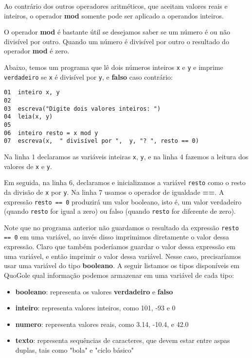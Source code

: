 \documentclass{report}
\newcommand{\Qgol}{QuoGol\;}
\begin{document}
Ao contrário dos outros operadores aritméticos, que aceitam
valores reais e inteiros, o operador \textbf{mod} somente pode
ser aplicado a operandos inteiros. 

O operador \textbf{mod} é bastante útil se desejamos saber se
um número é ou não divisível por outro. Quando um número é divisível
por outro o resultado do operador \textbf{mod} é zero.

Abaixo, temos um programa que lê dois números inteiros \texttt{x} e \texttt{y}
e imprime \texttt{verdadeiro} se \texttt{x} é divisível por \texttt{y}, e
\textbf{falso} caso contrário:
%
\begin{verbatim}
01  inteiro x, y
02  
03  escreva("Digite dois valores inteiros: ")
04  leia(x, y)
05 
06  inteiro resto = x mod y
07  escreva(x,  " divisível por ",  y, "? ", resto == 0)
\end{verbatim}

Na linha 1 declaramos as variáveis inteiras \texttt{x}, \texttt{y},
e na linha 4 fazemos a leitura dos valores de \texttt{x} e \texttt{y}.

Em seguida, na linha 6, declaramos e inicializamos a variável \texttt{resto}
como o resto da divisão de \texttt{x} por \texttt{y}. Na linha 7 usamos o
operador de igualdade \textbf{==}. A expressão \texttt{resto == 0} produzirá
um valor booleano, isto é, um valor verdadeiro (quando \texttt{resto} for igual a zero)
ou falso (quando \texttt{resto} for diferente de zero). 

Note que no programa anterior não guardamos o resultado da expressão
\texttt{resto == 0} em uma variável, ao invés disso imprimimos diretamente
o valor dessa expressão. Claro que também poderíamos guardar o valor dessa
expressão em uma variável, e então imprimir o valor dessa variável. Nesse
caso, precisaríamos usar uma variável do tipo \textbf{booleano}. A seguir
listamos os tipos disponíveis em \Qgol e qual informação podemos armazenar
em uma variável de cada tipo:

\begin{itemize}
	\item \textbf{booleano}: representa os valores \textbf{verdadeiro} e \textbf{falso}
	\item \textbf{inteiro}: representa valores inteiros, como 101, -93 e 0
	\item \textbf{numero}: representa valores reais, como 3.14, -10.4, e 42.0
	\item \textbf{texto}: representa sequências de caracteres, que devem estar entre
  aspas duplas, tais como "bola" e "ciclo básico"
\end{itemize}
\end{document}
